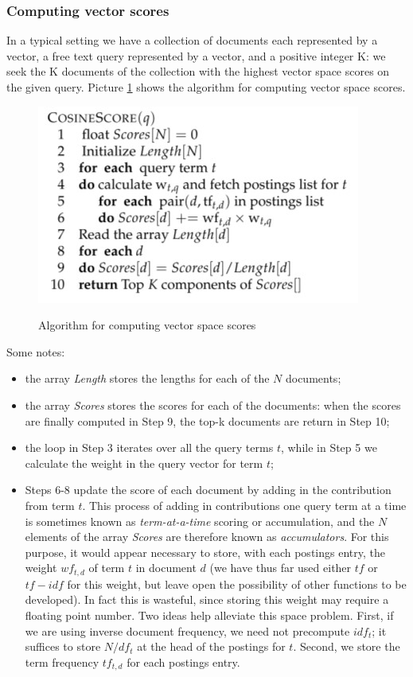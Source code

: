 \subsubsection{Computing vector scores}
In a typical setting we have a collection of documents each represented by a vector, a free text query represented by a vector, and a positive integer K: we seek the K documents of the collection with the highest vector space scores on the given query. Picture \ref{cosine score} shows the algorithm for computing vector space scores.

\begin{figure}[h!]
		\centering
		\includegraphics[scale = 2.0]{img/cosine score.jpg}
		\label{cosine score}
        \caption{Algorithm for computing vector space scores}
\end{figure}

Some notes:
\begin{itemize}
    \item the array \textit{Length} stores the lengths for each of the $N$ documents;
    \item the array \textit{Scores} stores the scores for each of the documents: when the scores are finally computed in Step 9, the top-k documents are return in Step 10;
    \item the loop in Step 3 iterates over all the query terms $t$, while in Step 5 we calculate the weight in the query vector for term $t$;
    \item Steps 6-8 update the score of each document by adding in the contribution from term $t$. This process of adding in contributions one query term at a time is sometimes known as \textit{term-at-a-time} scoring or accumulation, and the $N$ elements of the array \textit{Scores} are therefore known as \textit{accumulators}. For this purpose, it would appear necessary to store, with each postings entry, the weight $wf_{t,d}$ of term $t$ in document $d$ (we have thus far used either $tf$ or $tf-idf$ for this weight, but leave open the possibility of other functions to be developed). In fact this is wasteful, since storing this weight may require a floating point number. Two ideas help alleviate this space problem. First, if we are using inverse document frequency, we need not precompute $idf_t$; it suffices to store $N/df_t$ at the head of the postings for $t$. Second, we store the term frequency $tf_{t,d}$ for each postings entry.
\end{itemize}

